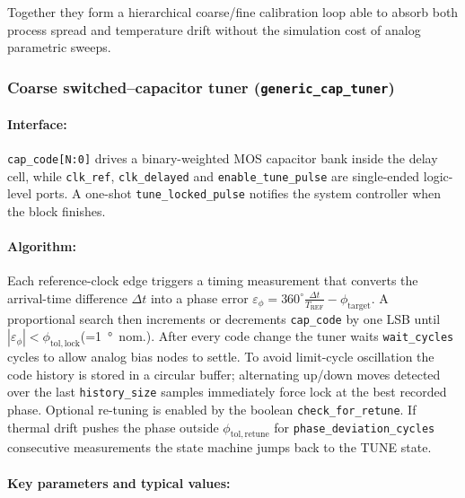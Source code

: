 Together they form a hierarchical coarse/fine calibration loop able to absorb both process spread and temperature drift without the simulation cost of analog parametric sweeps.

\subsubsection{Coarse switched–capacitor tuner (\texttt{generic\_cap\_tuner})}
\paragraph{Interface:}

\texttt{cap\_code[N{:}0]} drives a binary-weighted MOS capacitor bank inside the delay cell,
while \texttt{clk\_ref}, \texttt{clk\_delayed} and \texttt{enable\_tune\_pulse} are single-ended logic-level ports.
A one-shot \texttt{tune\_locked\_pulse} notifies the system controller when the block finishes.

\paragraph{Algorithm:}

Each reference-clock edge triggers a timing measurement that converts the arrival-time difference
\(\Delta t\) into a phase error
\(\varepsilon_\phi = 360^\circ \tfrac{\Delta t}{T_{\mathrm{REF}}}-\phi_\mathrm{target}\).
A proportional search then increments or decrements \texttt{cap\_code} by one LSB
until \(|\varepsilon_\phi|<\phi_\mathrm{tol,lock}\)\;(=\SI{1}{\degree}~nom.).
After every code change the tuner waits \texttt{wait\_cycles} cycles to allow analog
 bias nodes to settle.
To avoid limit-cycle oscillation the code history is stored in a circular buffer; alternating up/down moves
detected over the last \texttt{history\_size} samples immediately force lock at the best recorded phase.
Optional re-tuning is enabled by the boolean \texttt{check\_for\_retune}.
If thermal drift pushes the phase outside \(\phi_\mathrm{tol,retune}\) for
\texttt{phase\_deviation\_cycles} consecutive measurements the state machine jumps back to the TUNE state.

\paragraph{Key parameters and typical values:}

